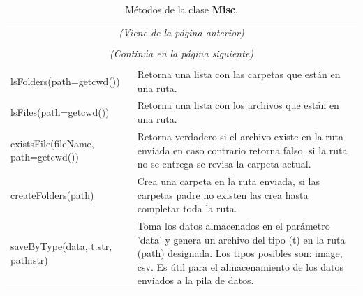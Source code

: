         \begin{longtable}[c]{ p{7cm} p{7cm} }
            \caption[Métodos de la clase Misc]{Métodos de la clase \textbf{Misc}.} \\ \toprule
            \endfirsthead
            \multicolumn{2}{c}{\textit{\textsl{(Viene de la página anterior)}}} \\
             \\ \toprule
            \endhead
            \multicolumn{2}{c}{\textsl{\textit{(Continúa en la página siguiente)}}}\\
            \endfoot
            \endlastfoot
            \hline
                    \multicolumn{2}{|c|}{\textbf{Gestión de archivos}}\\ 
                    \hline\hline
                    lsFolders(path=getcwd()) & Retorna una lista con las carpetas que están en una ruta.\\
                    \hline
                    lsFiles(path=getcwd()) & Retorna una lista con los archivos que están en una ruta.\\
                    \hline
                    existsFile(fileName, path=getcwd()) & Retorna verdadero si el archivo existe en la ruta enviada en caso contrario retorna falso. si la ruta no se entrega se revisa la carpeta actual.\\
                    \hline
                    createFolders(path) & Crea una carpeta en la ruta enviada, si las carpetas padre no existen las crea hasta completar toda la ruta.\\
                    \hline
                    saveByType(data, t:str, path:str) & Toma los datos almacenados en el parámetro 'data' y genera un archivo del tipo (t) en la ruta (path) designada. Los tipos posibles son: image, csv. Es útil para el almacenamiento de los datos enviados a la pila de datos.\\
                    

\end{longtable}
